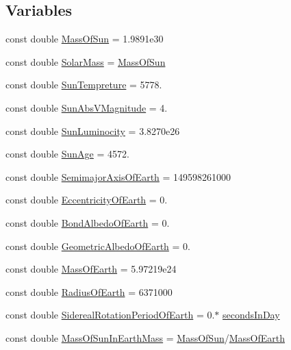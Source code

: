 \subsection*{Variables}
\begin{DoxyCompactItemize}
\item 
const double \hyperlink{namespace_e_g_x_phys_a6e84ae13f1dbcecb215af787bbc12cd6}{Mass\+Of\+Sun} = 1.\+9891e30
\item 
const double \hyperlink{namespace_e_g_x_phys_aa8636def23e66bc4ad32394a088b3950}{Solar\+Mass} = \hyperlink{namespace_e_g_x_phys_a6e84ae13f1dbcecb215af787bbc12cd6}{Mass\+Of\+Sun}
\item 
const double \hyperlink{namespace_e_g_x_phys_a97be71e7f8ca4f7813362bc1dca66db5}{Sun\+Tempreture} = 5778.
\item 
const double \hyperlink{namespace_e_g_x_phys_a61266dc1aaacdd9a9bd0f2fa92aa21c9}{Sun\+Abs\+V\+Magnitude} = 4.
\item 
const double \hyperlink{namespace_e_g_x_phys_a3987543f6972eb72eb2c07d39520b43e}{Sun\+Luminocity} = 3.\+8270e26
\item 
const double \hyperlink{namespace_e_g_x_phys_a173216c099d7915fb16e6416902fcbb8}{Sun\+Age} = 4572.
\item 
const double \hyperlink{namespace_e_g_x_phys_ad1bdca5cec4a0f4a4b8a18ead61de6d9}{Semimajor\+Axis\+Of\+Earth} = 149598261000
\item 
const double \hyperlink{namespace_e_g_x_phys_a327bbaf59d546f8524d6fb9da919d939}{Eccentricity\+Of\+Earth} = 0.
\item 
const double \hyperlink{namespace_e_g_x_phys_a932fff28fce4321fdbf9abc5c1783dc9}{Bond\+Albedo\+Of\+Earth} = 0.
\item 
const double \hyperlink{namespace_e_g_x_phys_aae01fb8ed365fc5de7acebeef34b7351}{Geometric\+Albedo\+Of\+Earth} = 0.
\item 
const double \hyperlink{namespace_e_g_x_phys_ace4a9d8c0b21215536857f4c1087a4e8}{Mass\+Of\+Earth} = 5.\+97219e24
\item 
const double \hyperlink{namespace_e_g_x_phys_a11a2d4a914eb43c4095e225358293a45}{Radius\+Of\+Earth} = 6371000
\item 
const double \hyperlink{namespace_e_g_x_phys_a34a388ac3f9196bb3cdbdbee5ff3cdb7}{Sidereal\+Rotation\+Period\+Of\+Earth} = 0.$\ast$ \hyperlink{namespace_e_g_x_phys_ab4f86327f64403b843077ecc189ce52b}{seconds\+In\+Day}
\item 
const double \hyperlink{namespace_e_g_x_phys_a05709972a6a6089eb968f667ce0bf656}{Mass\+Of\+Sun\+In\+Earth\+Mass} = \hyperlink{namespace_e_g_x_phys_a6e84ae13f1dbcecb215af787bbc12cd6}{Mass\+Of\+Sun}/\hyperlink{namespace_e_g_x_phys_ace4a9d8c0b21215536857f4c1087a4e8}{Mass\+Of\+Earth}

\end{DoxyCompactItemize}
